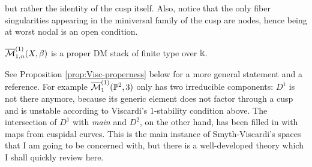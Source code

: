 \noindent but rather the identity of the cusp itself. Also, notice that the only fiber singularities appearing in the miniversal family of the cusp are nodes, hence being at worst nodal is an open condition.
\begin{prop}
 $\overline{\mathcal M}^{(1)}_{1,n}(X,\beta)$ is a proper DM stack of finite type over $\Bbbk$.
\end{prop}
See Proposition \ref{prop:Visc-properness} below for a more general statement and a reference. For example $\overline{\mathcal{M}}^{(1)}_1(\mathbb P^2,3)$ only has two irreducible components: $D^1$ is not there anymore, because its generic element does not factor through a cusp and is unstable according to Viscardi's $1$-stability condition above. The intersection of $D^1$ with \emph{main} and $D^2$, on the other hand, has been filled in with maps from cuspidal curves. This is the main instance of Smyth-Viscardi's spaces that I am going to be concerned with, but there is a well-developed theory which I shall quickly review here.
